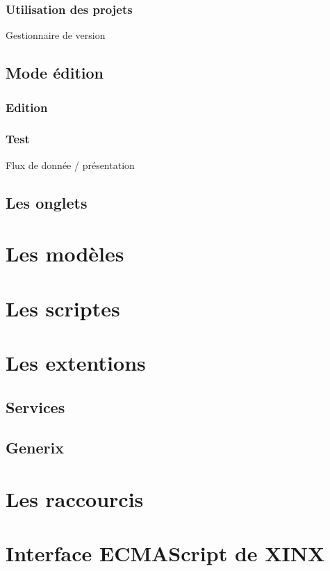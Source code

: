 \documentclass[a4paper,10pt,twoside,titlepage,onecolumn]{book}
\begin{document}
\subsection{Utilisation des projets}

Gestionnaire de version

\section{Mode édition}

\subsection{Edition}

\subsection{Test}

Flux de donnée / présentation

\section{Les onglets}

\chapter{Les modèles}

\chapter{Les scriptes}

\chapter{Les extentions}

\section{Services}

\section{Generix}

\appendix
\chapter{Les raccourcis}

\chapter{Interface ECMAScript de XINX}
\end{document}
